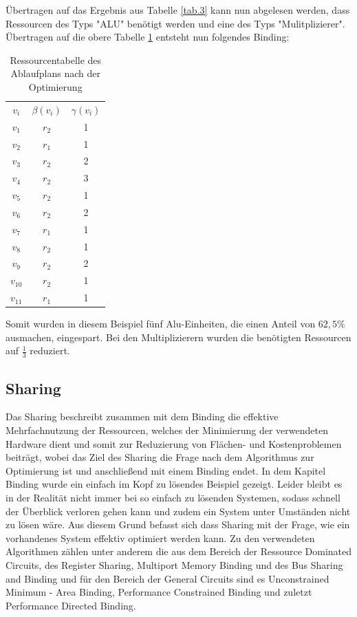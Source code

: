 \documentclass[conference]{IEEEtran}
\begin{document}
Übertragen auf das Ergebnis aus Tabelle \ref{tab.3} kann nun abgelesen werden, dass Ressourcen des Typs "ALU" benötigt werden und eine des Typs "Mulitplizierer".\\
Übertragen auf die obere Tabelle \ref{tab.5} entsteht nun folgendes Binding:\\
\begin{table}[h]
\caption{Ressourcentabelle des Ablaufplans nach der Optimierung}
\label{tab.5}
\begin{center}
\begin{tabular}[h]{ccc}
$v_i$&$\beta(v_i)$&$\gamma(v_i)$\\
$v_1$&$r_2$&1\\
$v_2$&$r_1$&1\\
$v_3$&$r_2$&2\\
$v_4$&$r_2$&3\\
$v_5$&$r_2$&1\\
$v_6$&$r_2$&2\\
$v_7$&$r_1$&1\\
$v_8$&$r_2$&1\\
$v_9$&$r_2$&2\\
$v_10$&$r_2$&1\\
$v_11$&$r_1$&1\\
\end{tabular}
\end{center}
\end{table}
Somit wurden in diesem Beispiel fünf Alu-Einheiten, die einen Anteil von $62,5\%$ ausmachen, eingespart. Bei den Multiplizierern wurden die benötigten Ressourcen auf $\frac{1}{3}$ reduziert.


\subsection{Sharing}
Das Sharing beschreibt zusammen mit dem Binding die effektive Mehrfachnutzung der Ressourcen, welches der Minimierung der verwendeten Hardware dient und somit zur Reduzierung von Flächen- und Kostenproblemen beiträgt, wobei das Ziel des Sharing die Frage nach dem Algorithmus zur Optimierung ist und anschließend mit einem Binding endet. In dem Kapitel Binding wurde ein einfach im Kopf zu lösendes Beispiel gezeigt. Leider bleibt es in der Realität nicht immer bei so einfach zu lösenden Systemen, sodass schnell der Überblick verloren gehen kann und zudem ein System unter Umständen nicht zu lösen wäre. Aus diesem Grund befasst sich dass Sharing mit der Frage, wie ein vorhandenes System effektiv optimiert werden kann. Zu den verwendeten Algorithmen zählen unter anderem die aus dem Bereich der Ressource Dominated Circuits, des Register Sharing, Multiport Memory Binding und des Bus Sharing and Binding und für den Bereich der General Circuits sind es Unconstrained Minimum - Area Binding, Performance Constrained Binding und zuletzt Performance Directed Binding.   
\end{document}
